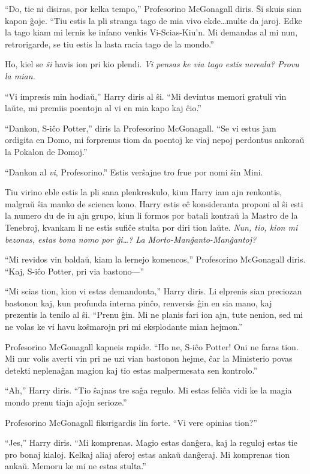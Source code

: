 ``Do, tie ni disiras, por kelka tempo,'' Profesorino McGonagall
diris. Ŝi skuis sian kapon ĝoje. ``Tiu estis la pli stranga tago de
mia vivo ekde\ldots multe da jaroj. Edke la tago kiam mi lernis ke
infano venkis Vi-Scias-Kiu'n. Mi demandas al mi nun, retrorigarde, se
tiu estis la lasta racia tago de la mondo.''

Ho, kiel se \emph{ŝi} havis ion pri kio plendi. \emph{Vi pensas ke via
  tago estis nereala? Provu la mian.}

``Vi impresis min hodiaŭ,'' Harry diris al ŝi. ``Mi devintus memori
gratuli vin laŭte, mi premiis poentojn al vi en mia kapo kaj ĉio.''

``Dankon, S-iĉo Potter,'' diris la Profesorino McGonagall. ``Se vi
estus jam ordigita en Domo, mi forprenus tiom da poentoj ke viaj nepoj
perdontus ankoraŭ la Pokalon de Domoj.''

``Dankon al \emph{vi}, Profesorino.'' Estis verŝajne tro frue por nomi
ŝin Mini.

Tiu virino eble estis la pli sana plenkreskulo, kiun Harry iam ajn
renkontis, malgraŭ ŝia manko de scienca kono. Harry estis eĉ
konsideranta proponi al ŝi esti la numero du de iu ajn grupo, kiun li
formos por batali kontraŭ la Mastro de la Tenebroj, kvankam li ne
estis sufiĉe stulta por diri tion laŭte. \emph{Nun, tio, kion mi
  bezonas, estas bona nomo por ĝi\ldots? La Morto-Manĝanto-Manĝantoj?}

``Mi revidos vin baldaŭ, kiam la lernejo komencos,'' Profesorino
McGonagall diris. ``Kaj, S-iĉo Potter, pri via bastono—''

``Mi scias tion, kion vi estas demandonta,'' Harry diris. Li elprenis
sian preciozan bastonon kaj, kun profunda interna pinĉo, renversis ĝin
en sia mano, kaj prezentis la tenilo al ŝi. ``Prenu ĝin. Mi ne planis
fari ion ajn, tute nenion, sed mi ne volas ke vi havu koŝmarojn pri mi
eksplodante mian hejmon.''

Profesorino McGonagall kapneis rapide. ``Ho ne, S-iĉo Potter! Oni ne
faras tion. Mi nur volis averti vin pri ne uzi vian bastonon hejme,
ĉar la Ministerio povas detekti neplenaĝan magion kaj tio estas
malpermesata sen kontrolo.''

``Ah,'' Harry diris. ``Tio ŝajnas tre saĝa regulo. Mi estas feliĉa
vidi ke la magia mondo prenu tiajn aĵojn serioze.''

Profesorino McGonagall fiksrigardis lin forte. ``Vi vere opinias tion?''

``Jes,'' Harry diris. ``Mi komprenas. Magio estas danĝera, kaj la
reguloj estas tie pro bonaj kialoj. Kelkaj aliaj aferoj estas ankaŭ
danĝeraj. Mi komprenas tion ankaŭ. Memoru ke mi ne estas stulta.''

